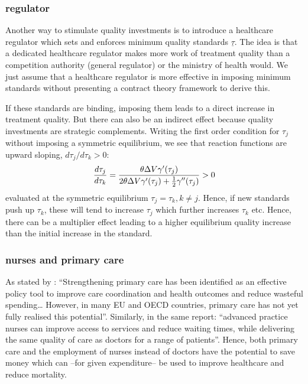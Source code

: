 \documentclass[a4paper,12pt]{article}
\begin{document}
\subsubsection{regulator}
\label{sec:orgd74c1f7}

Another way to stimulate quality investments is to introduce a healthcare regulator which sets and enforces minimum quality standards \(\underline \tau\). The idea is that a dedicated healthcare regulator makes more work of treatment quality than a competition authority (general regulator) or the ministry of health would. We just assume that a healthcare regulator is more effective in imposing minimum standards without presenting a contract theory framework to derive this.

If these standards are binding, imposing them leads to a direct increase in treatment quality. But there can also be an indirect effect because quality investments are strategic complements. Writing the first order condition for \(\tau_j\) without imposing a symmetric equilibrium, we see that reaction functions are upward sloping, \(d \tau_j/d \tau_k > 0\):
\begin{equation}
\label{eq:28}
\frac{d\tau_j}{d\tau_k} = \frac{\theta \Delta V \gamma'(\tau_j)}{2\theta\Delta V \gamma'(\tau_j) + \textstyle{1\over 2} \gamma''(\tau_j)} > 0
\end{equation}
evaluated at the symmetric equilibrium \(\tau_j=\tau_k, k \neq j\). Hence, if new standards push up \(\tau_k\), these will tend to increase \(\tau_j\) which further increases \(\tau_k\) etc. Hence, there can be a multiplier effect leading to a higher equilibrium quality increase than the initial increase in the standard.

\subsubsection{nurses and primary care}
\label{sec:org3777975}

As stated by \cite{OECD_2020}: ``Strengthening primary care has been identified as an effective policy tool to improve care coordination and health outcomes and reduce wasteful spending\ldots{} However, in many EU and OECD countries, primary care has not yet fully realised this potential''. Similarly, in the same report: ``advanced practice nurses can improve access to services and reduce waiting times, while delivering the same quality of care as doctors for a range of patients''. Hence, both primary care and the employment of nurses instead of doctors have the potential to save money which can --for given expenditure-- be used to improve healthcare and reduce mortality.
\end{document}
